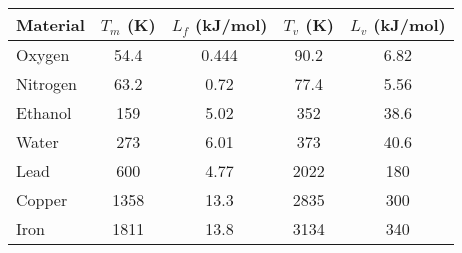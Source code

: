 \begin{tabular}{lcccc}
\hline\hline
Material & $T_m$ (K) & $L_f$ (kJ/mol) & $T_v$ (K) & $L_v$ (kJ/mol) \\ \hline
\noalign{\smallskip}
Oxygen & 54.4 & 0.444 & 90.2 & 6.82 \\
Nitrogen & 63.2 & 0.72 & 77.4 & 5.56 \\
Ethanol & 159 & 5.02 & 352 & 38.6 \\
Water & 273 & 6.01 & 373 & 40.6  \\ 
Lead & 600 & 4.77 & 2022 & 180 \\
Copper & 1358 & 13.3 & 2835 & 300 \\
Iron  & 1811 & 13.8 & 3134 & 340 \\
\hline\hline
\end{tabular}

